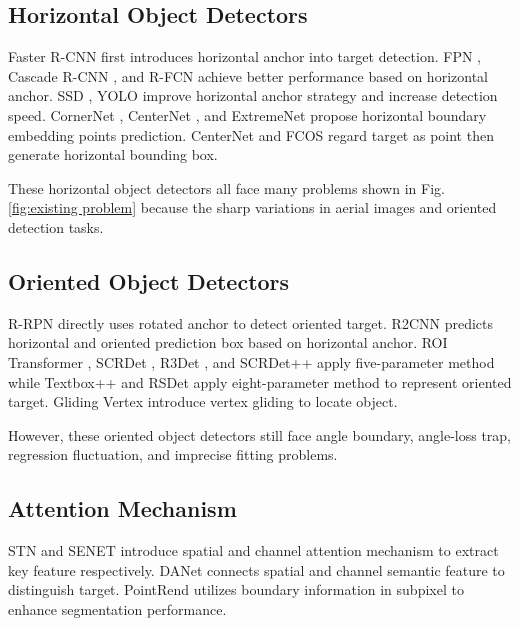 \documentclass[10pt,twocolumn]{article}
\begin{document}
\subsection{Horizontal Object Detectors}\label{HOD}

Faster R-CNN \cite{ren2015faster} first introduces horizontal anchor into target detection. FPN \cite{lin2017feature}, Cascade R-CNN \cite{cai2018cascade}, and R-FCN \cite{dai2016r} achieve better performance based on horizontal anchor. SSD \cite{liu2016ssd}, YOLO \cite{redmon2016you}\cite{redmon2017yolo}\cite{redmon2018yolov3} improve horizontal anchor strategy and increase detection speed. CornerNet \cite{law2018cornernet}, CenterNet \cite{duan2019centernet}, and ExtremeNet \cite{zhou2019bottom} propose horizontal boundary embedding points prediction. CenterNet \cite{zhou2019objects} and FCOS \cite{tian2019fcos} regard target as point then generate horizontal bounding box.

These horizontal object detectors all face many problems shown in Fig.\ref{fig:existing problem} because the sharp variations in aerial images and oriented detection tasks.

\subsection{Oriented Object Detectors}\label{OOD}

R-RPN \cite{ma2018arbitrary} directly uses rotated anchor to detect oriented target. R2CNN \cite{jiang2017r2cnn} predicts horizontal and oriented prediction box based on horizontal anchor. ROI Transformer \cite{ding2019learning}, SCRDet \cite{yang2019scrdet},  R3Det \cite{yang2019r3det}, and SCRDet++ \cite{yang2020scrdet++} apply five-parameter method while Textbox++ \cite{liao2018textboxes++} and RSDet \cite{qian2019learning} apply eight-parameter method to represent oriented target. Gliding Vertex \cite{xu2020gliding} introduce vertex gliding to locate object.

However, these oriented object detectors still face angle boundary, angle-loss trap, regression fluctuation, and imprecise fitting problems.

\subsection{Attention Mechanism}\label{AM}

STN \cite{jaderberg2015spatial} and SENET \cite{hu2018squeeze} introduce spatial and channel attention mechanism to extract key feature respectively. DANet \cite{fu2019dual} connects spatial and channel semantic feature to distinguish target. PointRend \cite{kirillov2020pointrend} utilizes boundary information in subpixel to enhance segmentation performance. 
\end{document}
